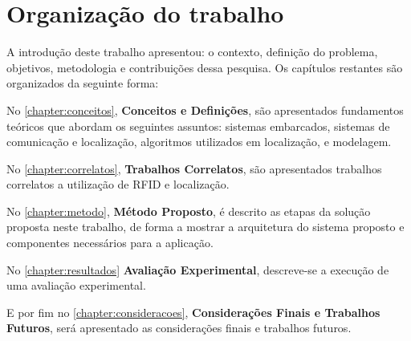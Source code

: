 \begin{comment}
\section{Metodologia Proposta}

\section{Contribuições propostas}
As contribuições propostas deste trabalho são:
\begin{enumerate}
    \item A implementação de um sistema para localização de objetos. O Método utilizado visa localizar objeto sem alta precisão, porém é viável para controle de acervos.
    \item O sistema desenvolvido pode auxiliar no controle e ainda facilitar o levantamento de todos os bens do proprietário.
\end{enumerate}

\end{comment}


\section{Organização do trabalho}
A introdução deste trabalho apresentou: o contexto, definição do problema, objetivos, metodologia e contribuições
dessa pesquisa. Os capítulos restantes são organizados da seguinte forma:

No \autoref{chapter:conceitos}, \textbf{Conceitos e Definições}, são apresentados fundamentos teóricos que abordam os
seguintes assuntos: sistemas embarcados, sistemas de comunicação e localização, algoritmos utilizados em localização, e modelagem.

\par
No \autoref{chapter:correlatos}, \textbf{Trabalhos Correlatos}, são apresentados trabalhos correlatos a utilização de RFID e localização.

\par
No \autoref{chapter:metodo}, \textbf{Método Proposto}, é descrito as etapas da solução proposta neste trabalho, de
forma a mostrar a arquitetura do sistema proposto e componentes necessários para a aplicação.

\par

No \autoref{chapter:resultados} \textbf{Avaliação Experimental}, descreve-se a execução de uma avaliação experimental.
\par
E por fim no \autoref{chapter:consideracoes}, \textbf{Considerações Finais e Trabalhos Futuros}, será apresentado as
considerações finais e trabalhos futuros.


